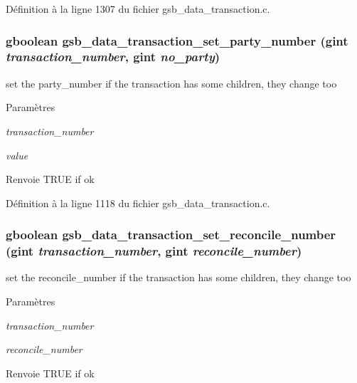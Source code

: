 Définition à la ligne 1307 du fichier gsb\_\-data\_\-transaction.c.

\subsubsection[{gsb\_\-data\_\-transaction\_\-set\_\-party\_\-number}]{\setlength{\rightskip}{0pt plus 5cm}gboolean gsb\_\-data\_\-transaction\_\-set\_\-party\_\-number (gint {\em transaction\_\-number}, \/  gint {\em no\_\-party})}\label{gsb__data__transaction_8c_ae334be534c1cfcc7dacf260008ee49f2}
set the party\_\-number if the transaction has some children, they change too


\begin{DoxyParams}{Paramètres}
\item[{\em transaction\_\-number}]\item[{\em value}]\end{DoxyParams}
\begin{DoxyReturn}{Renvoie}
TRUE if ok 
\end{DoxyReturn}


Définition à la ligne 1118 du fichier gsb\_\-data\_\-transaction.c.

\subsubsection[{gsb\_\-data\_\-transaction\_\-set\_\-reconcile\_\-number}]{\setlength{\rightskip}{0pt plus 5cm}gboolean gsb\_\-data\_\-transaction\_\-set\_\-reconcile\_\-number (gint {\em transaction\_\-number}, \/  gint {\em reconcile\_\-number})}\label{gsb__data__transaction_8c_ab8a486754eb6b78bc3eaf156de7cec3f}
set the reconcile\_\-number if the transaction has some children, they change too


\begin{DoxyParams}{Paramètres}
\item[{\em transaction\_\-number}]\item[{\em reconcile\_\-number}]\end{DoxyParams}
\begin{DoxyReturn}{Renvoie}
TRUE if ok 
\end{DoxyReturn}


